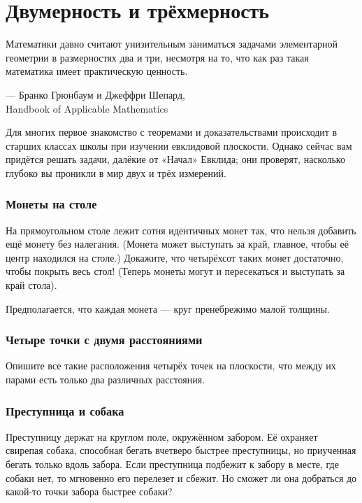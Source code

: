 \chapter{Двумерность и трёхмерность}


\setlength{\epigraphwidth}{.83\textwidth}
\epigraph{Математики давно считают унизительным заниматься задачами элементарной геометрии в размерностях два и три, несмотря на то, что как раз такая математика имеет практическую ценность.}{--- Бранко Грюнбаум и Джеффри Шепард,\\ Handbook of Applicable Mathematics}

Для многих первое знакомство с теоремами и доказательствами
происходит в старших классах школы при изучении евклидовой плоскости.
Однако сейчас вам придётся решать задачи, далёкие от «Начал» Евклида;
они проверят, насколько глубоко вы проникли в мир двух и трёх измерений.

\subsection*{Монеты на столе}\label{Монеты на столе}

На прямоугольном столе лежит сотня идентичных монет так, что нельзя добавить ещё монету без налегания.
(Монета может выступать за край, главное, чтобы её центр находился на столе.)
Докажите, что четырёхсот таких монет достаточно, чтобы покрыть весь стол!
(Теперь монеты могут и пересекаться и выступать за край стола).

Предполагается, что каждая монета --- круг пренебрежимо малой толщины.

\subsection*{Четыре точки с двумя расстояниями}

Опишите все такие расположения четырёх точек на плоскости, что между их парами есть только два различных расстояния.

\subsection*{Преступница и собака}

Преступницу держат на круглом  поле, окружённом забором.
Её охраняет свирепая собака, способная бегать вчетверо быстрее преступницы, но приученная бегать только вдоль забора.
Если преступница подбежит к забору в месте, где собаки нет, то мгновенно его перелезет и сбежит.
Но сможет ли она добраться до какой-то точки забора быстрее собаки?

